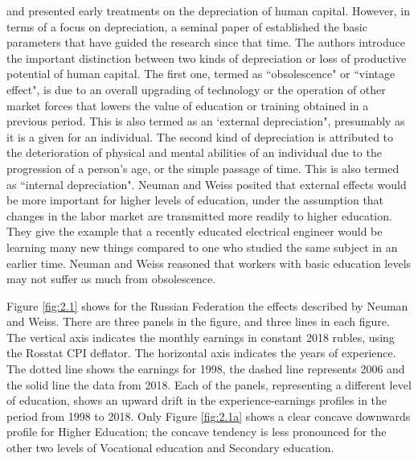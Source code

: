 \documentclass[12pt,a4paper]{article}
\numberwithin{equation}{section}
\begin{document}
\citet{rosen_176._1976}  and \citet{mincer_175._1982} presented early treatments on the depreciation of human capital. However, in terms of a focus on depreciation, a seminal paper of \citet{neuman_091._1995} established the basic parameters that have guided the research since that time. The authors introduce the important distinction between two kinds of depreciation or loss of productive potential of human capital. The first one, termed as ``obsolescence" or ``vintage effect", is due to an overall upgrading of technology or the operation of other market forces that lowers the value of education or training obtained in a previous period. This is also termed as an `external depreciation", presumably as it is a given for an individual. The second kind of depreciation is attributed to the deterioration of physical and mental abilities of an individual due to the progression of a person's age, or the simple passage of time. This is also termed as ``internal depreciation". Neuman and Weiss posited that external effects would be more important for higher levels of education, under the assumption that changes in the labor market are transmitted more readily to higher education. They give the example that a recently educated electrical engineer would be learning many new things compared to one who studied the same subject in an earlier time. Neuman and Weiss reasoned that workers with basic education levels may not suffer as much from obsolescence. 

Figure \ref{fig:2.1} shows for the Russian Federation the effects described by Neuman and Weiss. There are three panels in the figure, and three lines in each figure. The vertical axis indicates the monthly earnings in constant 2018 rubles, using the Rosstat CPI deflator. The horizontal axis indicates the years of experience. The dotted line shows the earnings for 1998, the dashed line represents 2006 and the solid line the data from 2018. Each of the panels, representing a different level of education, shows an upward drift in the experience-earnings profiles in the period from 1998 to 2018. Only Figure \ref{fig:2.1a} shows a clear concave downwards profile for Higher Education; the concave tendency is less pronounced for the other two levels of Vocational education and Secondary education.
	
\end{document}
